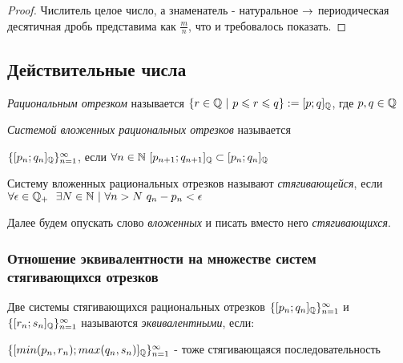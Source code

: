 \begin{proof}
    Числитель целое число, а знаменатель - натуральное $\rightarrow$ периодическая десятичная дробь представима как $\frac{m}{n}$, что и требовалось показать.
\end{proof}

\subsection{Действительные числа}



\begin{definition}
    \textit{Рациональным отрезком} называется $\{r \in \mathbb{Q}\ |\ p \leqslant r \leqslant q\} := [p; q]_{\mathbb{Q}}$, где $p, q \in \mathbb{Q}$
\end{definition}

\begin{definition}
    \textit{Системой вложенных рациональных отрезков} называется 
    
    $\{[p_n;q_n]_{\mathbb{Q}}\}_{n = 1}^\infty$, если $\forall n \in \mathbb{N}\ [p_{n + 1}; q_{n + 1}]_{\mathbb{Q}} \subset [p_n; q_n]_{\mathbb{Q}}$
\end{definition}

\begin{definition}
    Систему вложенных рациональных отрезков называют \textit{стягивающейся}, если $\forall \epsilon \in \mathbb{Q}_+\ \ \exists N \in \mathbb{N}\ |\ \forall n > N\ q_n - p_n < \epsilon$
    
    Далее будем опускать слово \textit{вложенных} и писать вместо него \textit{стягивающихся}.
\end{definition}

\subsubsection{Отношение эквивалентности на множестве систем стягивающихся отрезков}

\begin{definition}
    Две системы стягивающихся рациональных отрезков $\{[p_n; q_n]_{\mathbb{Q}}\}_{n = 1}^\infty$ и $\{[r_n; s_n]_{\mathbb{Q}}\}_{n = 1}^\infty$ называются \textit{эквивалентными}, если:
    
    $\{[min(p_n, r_n); max(q_n, s_n)]_{\mathbb{Q}}\}_{n = 1}^\infty$ - тоже стягивающаяся последовательность
\end{definition}

